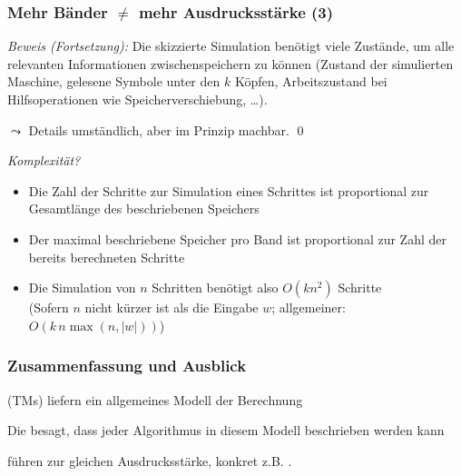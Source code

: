 \documentclass[aspectratio=1610,onlymath]{beamer}
\begin{document}
\begin{frame}[t]\frametitle{Mehr Bänder $\neq$ mehr Ausdrucksstärke (3)}


\emph{Beweis (Fortsetzung):} Die skizzierte Simulation benötigt viele Zustände, um alle relevanten Informationen zwischenspeichern zu können (Zustand der simulierten Maschine, gelesene Symbole unter den $k$ Köpfen, Arbeitszustand bei Hilfsoperationen wie Speicherverschiebung, \ldots).\medskip

$\leadsto$ Details umständlich, aber im Prinzip machbar. \qed
\pause\bigskip

\emph{Komplexität?}
\begin{itemize}
\item Die Zahl der Schritte zur Simulation eines Schrittes ist proportional zur Gesamtlänge des beschriebenen Speichers 
\item Der maximal beschriebene Speicher pro Band ist proportional zur Zahl der bereits berechneten Schritte
\item Die Simulation von $n$ Schritten benötigt also $O(k n^2)$ Schritte\\[-1ex]{\tiny (Sofern $n$ nicht kürzer ist als die Eingabe $w$; allgemeiner: $O(k\, n \max(n,|w|))$)}
\end{itemize}
\end{frame}



\begin{frame}\frametitle{Zusammenfassung und Ausblick}

 (TMs) liefern ein allgemeines Modell der Berechnung
\bigskip

Die  besagt, dass jeder Algorithmus in diesem Modell beschrieben werden kann
\bigskip

 führen zur gleichen Ausdrucksstärke, konkret z.B. .
\bigskip


\end{frame}
\end{document}
